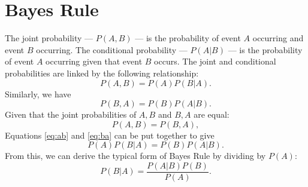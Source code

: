 \chapter{Bayes Rule}\label{ch:bayes_rule}

The joint probability --- $P(A, B)$ --- is the probability of event $A$ occurring
and event $B$ occurring.
The conditional probability --- $P(A | B)$ --- is the probability of event $A$
occurring given that event $B$ occurs.
The joint and conditional probabilities are linked by the following relationship:
\begin{equation}\label{eq:ab}
    P(A, B) = P(A) P(B | A).
\end{equation}
Similarly, we have
\begin{equation}\label{eq:ba}
    P(B, A) = P(B) P(A | B).
\end{equation}
Given that the joint probabilities of $A, B$ and $B, A$ are equal:
\begin{equation*}
    P(A, B) = P(B, A),
\end{equation*}
Equations \ref{eq:ab} and \ref{eq:ba} can be put together to give
\begin{equation}\label{eq:pre_bayes}
    P(A) P(B | A) = P(B) P(A | B).
\end{equation}
From this, we can derive the typical form of Bayes Rule by dividing by $P(A)$:
\begin{equation}\label{eq:bayes}
    P(B | A) = \frac{P(A | B) P(B)}{P(A)}.
\end{equation}
